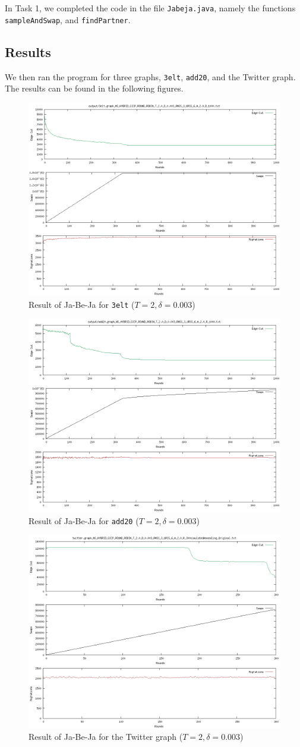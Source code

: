 \documentclass[]{article}
\begin{document}
In Task 1, we completed the code in the file \texttt{Jabeja.java}, namely the functions \texttt{sampleAndSwap}, and \texttt{findPartner}.

\subsection{Results}

We then ran the program for three graphs, \texttt{3elt}, \texttt{add20}, and the Twitter graph. The results can be found in the following figures.

\begin{figure}[!h]
    \centering
    \includegraphics[width=.5\textwidth]{../3elt_noCooldDown.png}
    \caption{Result of Ja-Be-Ja for \texttt{3elt} ($T=2, \delta=0.003$)}
\end{figure}

\begin{figure}[!h]
    \centering
    \includegraphics[width=.5\textwidth]{../add20_noCooldDown.png}
    \caption{Result of Ja-Be-Ja for \texttt{add20} ($T=2, \delta=0.003$)}
\end{figure}

\begin{figure}[!h]
    \centering
    \includegraphics[width=.5\textwidth]{../task2/twitter.graph_NS_HYBRID_GICP_ROUND_ROBIN_T_2.0_D_0.003_RNSS_3_URSS_6_A_2.0_R_300simulatedAnnealing_Original.txt.png}
    \caption{Result of Ja-Be-Ja for the Twitter graph ($T=2, \delta=0.003$)}
\end{figure}
\end{document}
